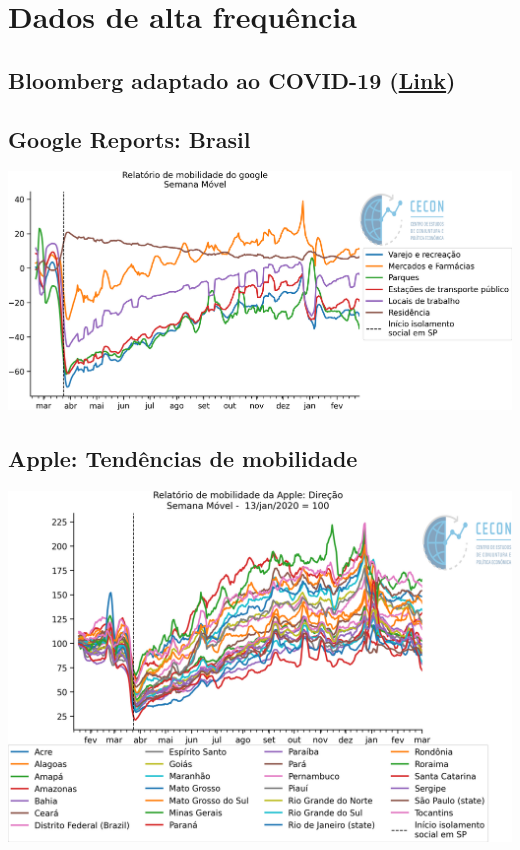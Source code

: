 \documentclass{SelfArx}
\begin{document}
\section*{Dados de alta frequência}
\label{sec:org08f3a03}

\subsection*{Bloomberg adaptado ao COVID-19 (\href{https://www.bloomberg.com/news/articles/2020-11-13/alternative-data-show-activity-crashes-as-virus-resurges-chart}{Link})}
\label{sec:orgf037567}

\subsection*{Google Reports: Brasil}
\label{sec:org08c5a62}

\begin{center}
\includegraphics[width=.9\linewidth]{./figs/Granulares/GoogleReport_Brasil.png}
\end{center}

\subsection*{Apple: Tendências de mobilidade}
\label{sec:org7138080}

\begin{center}
\includegraphics[width=.9\linewidth]{./figs/Granulares/AppleReport_Brasil.png}
\end{center}
\end{document}
